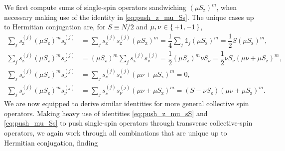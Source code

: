\documentclass[aps,pra,twocolumn,longbibliography]{revtex4-2}
\newcommand{\f}[2]{\dfrac{#1}{#2}} %
\newcommand{\p}[1]{\left( #1 \right)} %
\newcommand{\z}{\text{z}}
\newcommand{\bnu}{{\bar\nu}}
\newcommand{\1}{\mathds{1}}
\begin{document}
We first compute sums of single-spin operators sandwiching
$\p{\mu S_\z}^m$, when necessary making use of the identity in
\eqref{eq:push_z_mu_Ss}.  The unique cases up to Hermitian conjugation
are, for $S\equiv N/2$ and $\mu,\nu\in\set{+1,-1}$,
\begin{align}
  \sum_j s_\z^{(j)} \p{\mu S_\z}^m s_\z^{(j)}
  &= \sum_j s_\z^{(j)} s_\z^{(j)} \p{\mu S_\z}^m
  = \f14 \sum_j \1_j \p{\mu S_\z}^m
  = \f12 S \p{\mu S_\z}^m, \\
  \sum_j s_\z^{(j)} \p{\mu S_\z}^m s_\nu^{(j)}
  &= \p{\mu S_\z}^m \sum_j s_\z^{(j)} s_\nu^{(j)}
  = \f12 \p{\mu S_\z}^m \nu S_\nu
  = \f12 \nu S_\nu \p{\mu\nu+\mu S_\z}^m, \\
  \sum_j s_\nu^{(j)} \p{\mu S_\z}^m s_\nu^{(j)}
  &= \sum_j s_\nu^{(j)} s_\nu^{(j)} \p{\mu\nu+\mu S_\z}^m
  = 0, \\
  \sum_j s_\bnu^{(j)} \p{\mu S_\z}^m s_\nu^{(j)}
  &= \sum_j s_\bnu^{(j)} s_\nu^{(j)} \p{\mu\nu+\mu S_\z}^m
  = \p{S-\nu S_\z} \p{\mu\nu+\mu S_\z}^m.
\end{align}
We are now equipped to derive similar identities for more general
collective spin operators.  Making heavy use of identities
\eqref{eq:push_z_mu_sS} and \eqref{eq:push_mu_Ss} to push single-spin
operators through transverse collective-spin operators, we again work
through all combinations that are unique up to Hermitian conjugation,
finding
\end{document}
